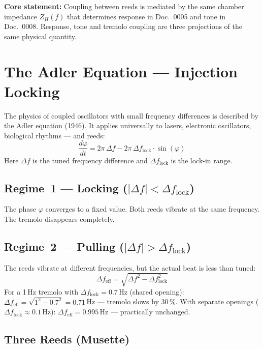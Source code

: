 \documentclass[11pt,a4paper]{article}
\begin{document}
\begin{keybox}
\textbf{Core statement:} Coupling between reeds is mediated by the same chamber impedance $Z_H(f)$ that determines response in Doc.~0005 and tone in Doc.~0008. Response, tone and tremolo coupling are three projections of the same physical quantity.
\end{keybox}

\section{The Adler Equation --- Injection Locking}

The physics of coupled oscillators with small frequency differences is described by the Adler equation (1946). It applies universally to lasers, electronic oscillators, biological rhythms --- and reeds:
\begin{equation}
\frac{d\varphi}{dt} = 2\pi\,\Delta f - 2\pi\,\Delta f_\text{lock} \cdot \sin(\varphi)
\end{equation}
Here $\Delta f$ is the tuned frequency difference and $\Delta f_\text{lock}$ is the lock-in range.

\subsection{Regime~1 --- Locking ($|\Delta f| < \Delta f_\text{lock}$)}
The phase $\varphi$ converges to a fixed value. Both reeds vibrate at the same frequency. The tremolo disappears completely.

\subsection{Regime~2 --- Pulling ($|\Delta f| > \Delta f_\text{lock}$)}
The reeds vibrate at different frequencies, but the actual beat is less than tuned:
\begin{equation}
\Delta f_\text{eff} = \sqrt{\Delta f^2 - \Delta f_\text{lock}^2}
\end{equation}
For a 1\,Hz tremolo with $\Delta f_\text{lock} = 0{.}7$\,Hz (shared opening): $\Delta f_\text{eff} = \sqrt{1^2 - 0{.}7^2} = 0{.}71$\,Hz --- tremolo slows by 30\,\%. With separate openings ($\Delta f_\text{lock} \approx 0{.}1$\,Hz): $\Delta f_\text{eff} = 0{.}995$\,Hz --- practically unchanged.

\subsection{Three Reeds (Musette)}
\end{document}
